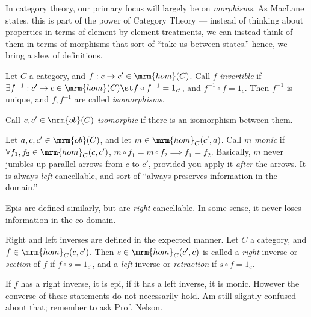 \documentclass[nocover]{pset}
\newcommand{\ob}{\mrm{ob}}
\newcommand{\homm}{\mrm{hom}}
\begin{document}
In category theory, our primary focus will largely be on
\emph{morphisms}. As MacLane states, this is part of the power of
Category Theory --- instead of thinking about properties in terms of
element-by-element treatments, we can instead think of them in terms
of morphisms that sort of ``take us between states.'' hence, we bring
a slew of definitions.\\

\begin{definition}
  Let $C$ a category, and $f : c \to c' \in \homm(C)$. Call $f$
  \emph{invertible} if $\exists f^{-1} : c' \to c \in \homm(C) \st
  f\circ f^{-1} = 1_{c'}$, and $f^{-1} \circ f = 1_c$. Then $f^{-1}$
  is unique, and $f, f^{-1}$ are called \emph{isomorphisms}.\\
\end{definition}
\begin{definition}[Isomorphism]
  Call $c, c' \in \ob(C)$ \emph{isomorphic} if there is an isomorphism
  between them.\\
\end{definition}
\begin{definition}[Monic]
  Let $a,c,c' \in \ob(C)$, and let $m \in \homm_C(c', a)$. Call $m$
  \emph{monic} if $\forall f_1, f_2 \in \homm_C(c,c')$, $m \circ f_1 =
  m \circ f_2 \implies f_1 = f_2$. Basically, $m$ never jumbles up
  parallel arrows from $c$ to $c'$, provided you apply it \emph{after}
  the arrows. It is always \emph{left}-cancellable, and sort of
  ``always preserves information in the domain.''\\
\end{definition}
\begin{definition}[Epi]
  Epis are defined similarly, but are \emph{right}-cancellable. In
  some sense, it never loses information in the co-domain.\\
\end{definition}
\begin{definition}
  Right and left inverses are defined in the expected manner. Let $C$
  a category, and $f \in \homm_C(c,c')$. Then $s \in \homm_C(c', c)$
  is called a \emph{right} inverse or \emph{section} of $f$ if $f\circ
  s = 1_{c'}$, and a \emph{left} inverse or \emph{retraction} if
  $s\circ f = 1_c$. \\
\end{definition}
If $f$ has a right inverse, it is epi, if it has a left inverse, it is
monic. However the converse of these statements do not necessarily
hold. Am still slightly confused about that; remember to ask Prof.
Nelson.
\end{document}
